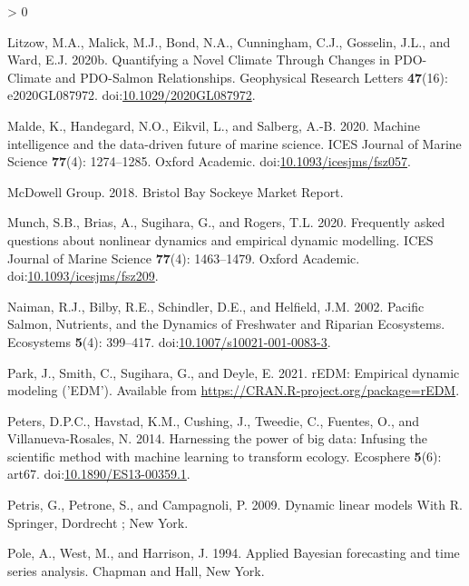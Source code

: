 \documentclass[
]{article}
\newlength{\cslhangindent}
\newenvironment{CSLReferences}[2] %
 {%
  \setlength{\parindent}{0pt}
  \ifodd #1 \everypar{\setlength{\hangindent}{\cslhangindent}}\ignorespaces\fi
  \ifnum #2 > 0
  \setlength{\parskip}{#2\baselineskip}
  \fi
 }%
 {}
\begin{document}
\begin{CSLReferences}{1}{0}
\leavevmode\hypertarget{ref-litzow2020}{}%
Litzow, M.A., Malick, M.J., Bond, N.A., Cunningham, C.J., Gosselin, J.L., and Ward, E.J. 2020b. Quantifying a {Novel Climate Through Changes} in {PDO}-{Climate} and {PDO}-{Salmon Relationships}. Geophysical Research Letters \textbf{47}(16): e2020GL087972. doi:\href{https://doi.org/10.1029/2020GL087972}{10.1029/2020GL087972}.

\leavevmode\hypertarget{ref-malde2020}{}%
Malde, K., Handegard, N.O., Eikvil, L., and Salberg, A.-B. 2020. Machine intelligence and the data-driven future of marine science. ICES Journal of Marine Science \textbf{77}(4): 1274--1285. {Oxford Academic}. doi:\href{https://doi.org/10.1093/icesjms/fsz057}{10.1093/icesjms/fsz057}.

\leavevmode\hypertarget{ref-mcdowellgroup2018}{}%
McDowell Group. 2018. Bristol {Bay Sockeye Market Report}.

\leavevmode\hypertarget{ref-munch2020}{}%
Munch, S.B., Brias, A., Sugihara, G., and Rogers, T.L. 2020. Frequently asked questions about nonlinear dynamics and empirical dynamic modelling. ICES Journal of Marine Science \textbf{77}(4): 1463--1479. {Oxford Academic}. doi:\href{https://doi.org/10.1093/icesjms/fsz209}{10.1093/icesjms/fsz209}.

\leavevmode\hypertarget{ref-naiman2002}{}%
Naiman, R.J., Bilby, R.E., Schindler, D.E., and Helfield, J.M. 2002. Pacific {Salmon}, {Nutrients}, and the {Dynamics} of {Freshwater} and {Riparian Ecosystems}. Ecosystems \textbf{5}(4): 399--417. doi:\href{https://doi.org/10.1007/s10021-001-0083-3}{10.1007/s10021-001-0083-3}.

\leavevmode\hypertarget{ref-park2020}{}%
Park, J., Smith, C., Sugihara, G., and Deyle, E. 2021. rEDM: Empirical dynamic modeling ('EDM'). Available from \url{https://CRAN.R-project.org/package=rEDM}.

\leavevmode\hypertarget{ref-peters2014}{}%
Peters, D.P.C., Havstad, K.M., Cushing, J., Tweedie, C., Fuentes, O., and Villanueva-Rosales, N. 2014. Harnessing the power of big data: Infusing the scientific method with machine learning to transform ecology. Ecosphere \textbf{5}(6): art67. doi:\href{https://doi.org/10.1890/ES13-00359.1}{10.1890/ES13-00359.1}.

\leavevmode\hypertarget{ref-petris2009}{}%
Petris, G., Petrone, S., and Campagnoli, P. 2009. Dynamic linear models {With R}. {Springer}, {Dordrecht ; New York}.

\leavevmode\hypertarget{ref-pole1994}{}%
Pole, A., West, M., and Harrison, J. 1994. Applied {Bayesian} forecasting and time series analysis. {Chapman and Hall}, {New York}.


\end{CSLReferences}
\end{document}
